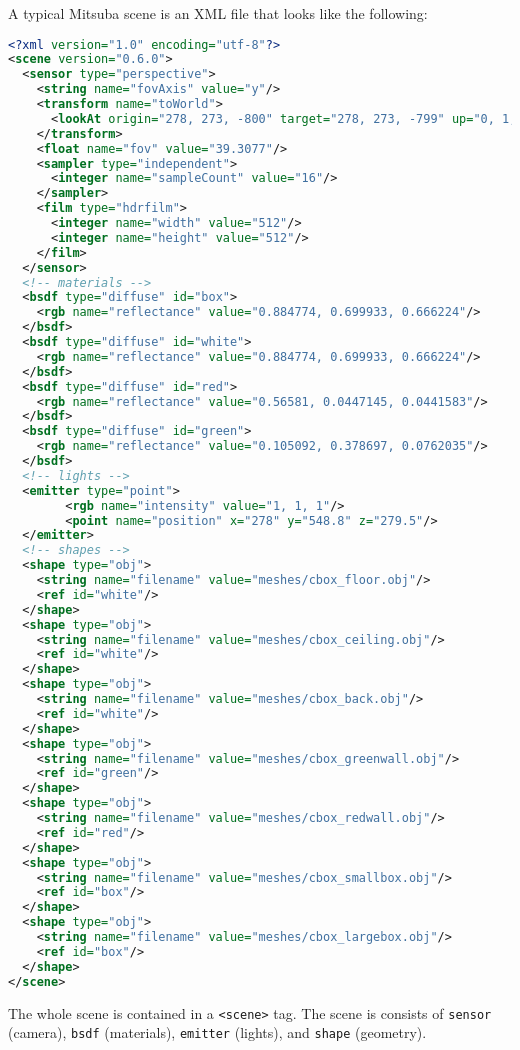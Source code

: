 A typical Mitsuba scene is an XML file that looks like the following:
\begin{lstlisting}[language=xml]
<?xml version="1.0" encoding="utf-8"?>
<scene version="0.6.0">
  <sensor type="perspective">
    <string name="fovAxis" value="y"/>
    <transform name="toWorld">
      <lookAt origin="278, 273, -800" target="278, 273, -799" up="0, 1, 0"/>
    </transform>
    <float name="fov" value="39.3077"/>
    <sampler type="independent">
      <integer name="sampleCount" value="16"/>
    </sampler>
    <film type="hdrfilm">
      <integer name="width" value="512"/>
      <integer name="height" value="512"/>
    </film>
  </sensor>
  <!-- materials -->
  <bsdf type="diffuse" id="box">
    <rgb name="reflectance" value="0.884774, 0.699933, 0.666224"/>
  </bsdf>
  <bsdf type="diffuse" id="white">
    <rgb name="reflectance" value="0.884774, 0.699933, 0.666224"/>
  </bsdf>
  <bsdf type="diffuse" id="red">
    <rgb name="reflectance" value="0.56581, 0.0447145, 0.0441583"/>
  </bsdf>
  <bsdf type="diffuse" id="green">
    <rgb name="reflectance" value="0.105092, 0.378697, 0.0762035"/>
  </bsdf>
  <!-- lights -->
  <emitter type="point">
        <rgb name="intensity" value="1, 1, 1"/>
        <point name="position" x="278" y="548.8" z="279.5"/>
  </emitter>
  <!-- shapes -->
  <shape type="obj">
    <string name="filename" value="meshes/cbox_floor.obj"/>
    <ref id="white"/>
  </shape>
  <shape type="obj">
    <string name="filename" value="meshes/cbox_ceiling.obj"/>
    <ref id="white"/>
  </shape>
  <shape type="obj">
    <string name="filename" value="meshes/cbox_back.obj"/>
    <ref id="white"/>
  </shape>
  <shape type="obj">
    <string name="filename" value="meshes/cbox_greenwall.obj"/>
    <ref id="green"/>
  </shape>
  <shape type="obj">
    <string name="filename" value="meshes/cbox_redwall.obj"/>
    <ref id="red"/>
  </shape>
  <shape type="obj">
    <string name="filename" value="meshes/cbox_smallbox.obj"/>
    <ref id="box"/>
  </shape>
  <shape type="obj">
    <string name="filename" value="meshes/cbox_largebox.obj"/>
    <ref id="box"/>
  </shape>
</scene>
\end{lstlisting}

The whole scene is contained in a \lstinline{<scene>} tag. 
The scene is consists of \lstinline{sensor} (camera), \lstinline{bsdf} (materials), \lstinline{emitter} (lights), and \lstinline{shape} (geometry). 

